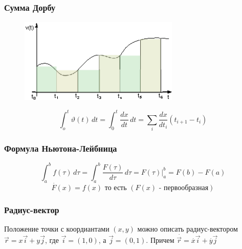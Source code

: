 \documentclass[class=article,a4paper,12pt,crop=false]{standalone}
\begin{document}
  \subsubsection{Сумма Дорбу}

  \begin{figure}[h]
    \centering
    \includegraphics[width=3in, height=1.6in]{lec_01_fig_03}
  \end{figure}  

  \begin{equation}
    \int_o^t \vartheta(t) \, dt = \int_0^t \frac{dx}{dt} \, dt = 
    \sum\limits_{i} \frac{dx}{dt_i} (t_{i + 1} - t_i) 
  \end{equation}

  \subsubsection{Формула Ньютона-Лейбница}

  \begin{equation}
    \int_a^b f(\tau) \, d\tau = \int_a^b \frac{F(\tau)}{d\tau} \, d\tau = F(\tau) |_a^b = F(b) - F(a)
  \end{equation}
  \begin{equation}
    \stackrel{\cdot}{F}(x) = f(x) \text{ то есть } (F(x) \text{ - первообразная})
  \end{equation}

  \subsubsection{Радиус-вектор}

  Положение точки с коордиантами $(x, y)$ можно описать радиус-вектором $\vec{r} = x\vec{i} + y\vec{j}$,
  где $\vec{i} = (1, 0)$, а $\vec{j} = (0, 1)$. Причем $\stackrel{\cdot}{\vec{r}} = \stackrel{\cdot}{x}\vec{i} + \stackrel{\cdot}{y}\vec{j}$
\end{document}
